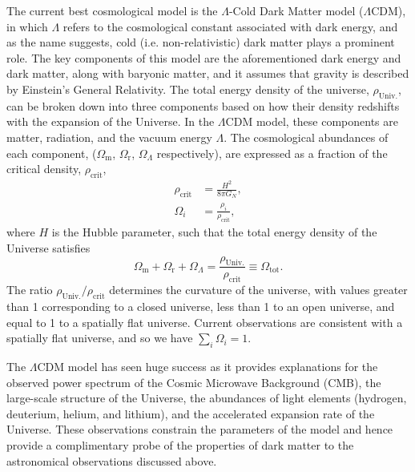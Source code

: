 The current best cosmological model is the $\Lambda$-Cold Dark Matter model ($\Lambda$CDM), in which $\Lambda$ refers to the cosmological constant associated with dark energy, and as the name suggests, cold (i.e. non-relativistic) dark matter plays a prominent role. The key components of this model are the aforementioned dark energy and dark matter, along with baryonic matter, and it assumes that gravity is described by Einstein's General Relativity. The total energy density of the universe, $\rho_\mathrm{Univ.}$, can be broken down into three components based on how their density redshifts with the expansion of the Universe. In the $\Lambda$CDM model, these components are matter, radiation, and the vacuum energy $\Lambda$. The cosmological abundances of each component, ($\Omega_\mathrm{m}$, $\Omega_\mathrm{r}$, $\Omega_\Lambda$ respectively), are expressed as a fraction of the critical density, $\rho_\mathrm{crit}$,     
\begin{align}
    \rho_\mathrm{crit}   & = \frac{H^2}{8 \pi G_N},\\
    \Omega_i & = \frac{\rho_i}{\rho_\mathrm{crit}},
\end{align}
where $H$ is the Hubble parameter, such that the total energy density of the Universe satisfies
\begin{equation}
    \Omega_\mathrm{m} + \Omega_\mathrm{r} + \Omega_\Lambda = \frac{\rho_\mathrm{Univ.}}{\rho_\mathrm{crit}} \equiv \Omega_\mathrm{tot}.
\end{equation}
The ratio $\rho_\mathrm{Univ.}/\rho_\mathrm{crit}$ determines the curvature of the universe, with values greater than 1 corresponding to a closed universe, less than 1 to an open universe, and equal to 1 to a spatially flat universe. Current observations are consistent with a spatially flat universe, and so we have $\sum_i \Omega_i = 1$.


The $\Lambda$CDM model has seen huge success as it provides explanations for the observed power spectrum of the Cosmic Microwave Background (CMB), the large-scale structure of the Universe, the abundances of light elements (hydrogen, deuterium, helium, and lithium), and the accelerated expansion rate of the Universe. These observations constrain the parameters of the model and hence provide a complimentary probe of the properties of dark matter to the astronomical observations discussed above.

